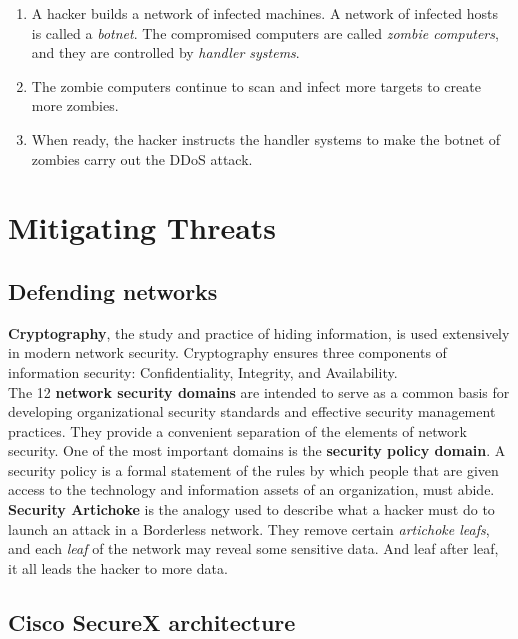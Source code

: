 \begin{enumerate}
\item A hacker builds a network of infected machines. A network of infected hosts is called a \emph{botnet}. The compromised computers are called \emph{zombie computers}, and they are controlled by \emph{handler systems}.
\item The zombie computers continue to scan and infect more targets to create more zombies.
\item When ready, the hacker instructs the handler systems to make the botnet of zombies carry out the DDoS attack.
\end{enumerate}

\section{Mitigating Threats}

\subsection{Defending networks}

\textbf{Cryptography}, the study and practice of hiding information, is used extensively in modern network security. Cryptography ensures three components of information security: Confidentiality, Integrity, and Availability.\\

The 12 \textbf{network security domains} are intended to serve as a common basis for developing organizational security standards and effective security management practices. They provide a convenient separation of the elements of network security. One of the most important domains is the \textbf{security policy domain}. A security policy is a formal statement of the rules by which people that are given access to the technology and information assets of an organization, must abide. \\

\textbf{Security Artichoke} is the analogy used to describe what a hacker must do to launch an attack in a Borderless network. They  remove certain \emph{artichoke leafs}, and each \emph{leaf} of the network may reveal some sensitive data. And leaf after leaf, it all leads the hacker to more data. 

\subsection{Cisco SecureX architecture}

